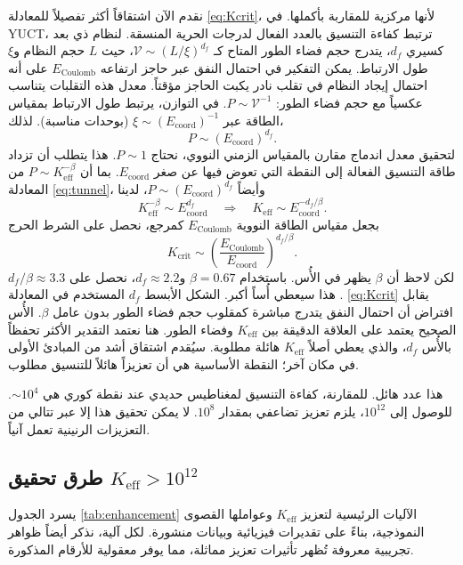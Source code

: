 \documentclass[11pt,a4paper]{article}
\newcommand{\Keff}{K_{\mathrm{eff}}}
\newcommand{\df}{d_{\!f}}
\newcommand{\Kcrit}{K_{\mathrm{crit}}}
\theoremstyle{remark}
\begin{document}
	نقدم الآن اشتقاقاً أكثر تفصيلاً للمعادلة \eqref{eq:Kcrit}، لأنها مركزية للمقاربة بأكملها. في YUCT، ترتبط كفاءة التنسيق بالعدد الفعال لدرجات الحرية المنسقة. لنظام ذي بعد كسيري \(\df\)، يتدرج حجم فضاء الطور المتاح كـ \( \mathcal{V} \sim (L/\xi)^{\df}\)، حيث \(L\) حجم النظام و\(\xi\) طول الارتباط. يمكن التفكير في احتمال النفق عبر حاجز ارتفاعه \(E_{\text{Coulomb}}\) على أنه احتمال إيجاد النظام في تقلب نادر يكبت الحاجز مؤقتاً. معدل هذه التقلبات يتناسب عكسياً مع حجم فضاء الطور: \(P \sim \mathcal{V}^{-1}\). في التوازن، يرتبط طول الارتباط بمقياس الطاقة عبر \(\xi \sim (E_{\mathrm{coord}})^{-1}\) (بوحدات مناسبة). لذلك،
	\[
	P \sim (E_{\mathrm{coord}})^{\df}.
	\]
	لتحقيق معدل اندماج مقارن بالمقياس الزمني النووي، نحتاج \(P \sim 1\). هذا يتطلب أن تزداد طاقة التنسيق الفعالة إلى النقطة التي تعوض فيها عن صغر \(E_{\mathrm{coord}}\). بما أن \(P \sim \Keff^{-\beta}\) من المعادلة \eqref{eq:tunnel}، وأيضاً \(P \sim (E_{\mathrm{coord}})^{\df}\)، لدينا
	\[
	\Keff^{-\beta} \sim E_{\mathrm{coord}}^{\df} \quad\Longrightarrow\quad \Keff \sim E_{\mathrm{coord}}^{-\df/\beta}.
	\]
	بجعل مقياس الطاقة النووية \(E_{\text{Coulomb}}\) كمرجع، نحصل على الشرط الحرج
	\[
	\Kcrit \sim \left( \frac{E_{\text{Coulomb}}}{E_{\mathrm{coord}}} \right)^{\df/\beta}.
	\]
	لكن لاحظ أن \(\beta\) يظهر في الأُس. باستخدام \(\beta = 0.67\) و\(\df \approx 2.2\)، نحصل على \(\df/\beta \approx 3.3\). هذا سيعطي أُساً أكبر. الشكل الأبسط \(\df\) المستخدم في المعادلة \eqref{eq:Kcrit} يقابل افتراض أن احتمال النفق يتدرج مباشرة كمقلوب حجم فضاء الطور بدون عامل \(\beta\). الأُس الصحيح يعتمد على العلاقة الدقيقة بين \(\Keff\) وفضاء الطور. هنا نعتمد التقدير الأكثر تحفظاً بالأُس \(\df\)، والذي يعطي أصلاً \(\Keff\) هائلة مطلوبة. سيُقدم اشتقاق أشد من المبادئ الأولى في مكان آخر؛ النقطة الأساسية هي أن تعزيزاً هائلاً للتنسيق مطلوب.
	
	هذا عدد هائل. للمقارنة، كفاءة التنسيق لمغناطيس حديدي عند نقطة كوري هي \(\sim 10^4\). للوصول إلى \(10^{12}\)، يلزم تعزيز تضاعفي بمقدار \(10^8\). لا يمكن تحقيق هذا إلا عبر تتالي من التعزيزات الرنينية تعمل آنياً.
	
	\subsection{طرق تحقيق \(\Keff > 10^{12}\)}
	
	يسرد الجدول \ref{tab:enhancement} الآليات الرئيسية لتعزيز \(\Keff\) وعواملها القصوى النموذجية، بناءً على تقديرات فيزيائية وبيانات منشورة. لكل آلية، نذكر أيضاً ظواهر تجريبية معروفة تُظهر تأثيرات تعزيز مماثلة، مما يوفر معقولية للأرقام المذكورة.
	
\end{document}
